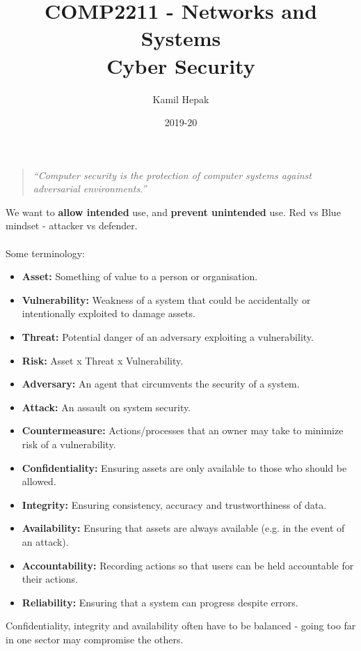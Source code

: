 \documentclass[]{article}
\title{COMP2211 - Networks and Systems \\ Cyber Security}
\author{Kamil Hepak}
\date{2019-20}
\begin{document}
\maketitle

\begin{quote}
    \emph{``Computer security is the protection of computer systems against adversarial environments.''}
\end{quote}

We want to \textbf{allow intended} use, and \textbf{prevent unintended} use. Red vs Blue mindset - attacker vs defender.
\\
\\
Some terminology:
\begin{itemize}
    \item \textbf{Asset:} Something of value to a person or organisation.
    \item \textbf{Vulnerability:} Weakness of a system that could be accidentally or intentionally exploited to damage assets.
    \item \textbf{Threat:} Potential danger of an adversary exploiting a vulnerability.
    \item \textbf{Risk:} Asset x Threat x Vulnerability.
    \item \textbf{Adversary:} An agent that circumvents the security of a system.
    \item \textbf{Attack:} An assault on system security.
    \item \textbf{Countermeasure:} Actions/processes that an owner may take to minimize risk of a vulnerability.
    \item \textbf{Confidentiality:} Ensuring assets are only available to those who should be allowed.
    \item \textbf{Integrity:} Ensuring consistency, accuracy and trustworthiness of data.
    \item \textbf{Availability:} Ensuring that assets are always available (e.g. in the event of an attack).
    \item \textbf{Accountability:} Recording actions so that users can be held accountable for their actions.
    \item \textbf{Reliability:} Ensuring that a system can progress despite errors.
\end{itemize}

Confidentiality, integrity and availability often have to be balanced - going too far in one sector may compromise the others.
\end{document}
